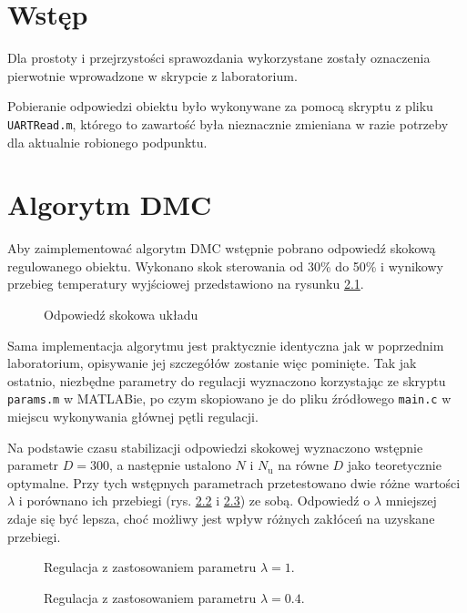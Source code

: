 \chapter{Wstęp}
Dla prostoty i przejrzystości sprawozdania wykorzystane zostały oznaczenia pierwotnie wprowadzone w skrypcie z laboratorium\@.

Pobieranie odpowiedzi obiektu było wykonywane za pomocą skryptu z pliku \verb|UARTRead.m|, którego to zawartość była nieznacznie zmieniana w razie potrzeby dla aktualnie robionego podpunktu.



\chapter{Algorytm DMC}

Aby zaimplementować algorytm DMC wstępnie pobrano odpowiedź skokową regulowanego obiektu. Wykonano skok sterowania od 30\% do 50\% i wynikowy przebieg temperatury wyjściowej przedstawiono na rysunku \ref{step}.

\begin{figure}[H]
	\centering
	
	\caption{Odpowiedź skokowa układu}
	\label{step}
\end{figure}

Sama implementacja algorytmu jest praktycznie identyczna jak w poprzednim laboratorium, opisywanie jej szczegółów zostanie więc pominięte. Tak jak ostatnio, niezbędne parametry do regulacji wyznaczono korzystając ze skryptu \verb|params.m| w MATLABie, po czym skopiowano je do pliku źródłowego \verb|main.c| w miejscu wykonywania głównej pętli regulacji.

Na podstawie czasu stabilizacji odpowiedzi skokowej wyznaczono wstępnie parametr $ D = 300 $, a następnie ustalono $ N $ i $ N_\mathrm{u} $ na równe $ D $ jako teoretycznie optymalne. Przy tych wstępnych parametrach przetestowano dwie różne wartości $ \lambda $ i porównano ich przebiegi (rys. \ref{DMC1} i \ref{DMC2}) ze sobą. Odpowiedź o $ \lambda $ mniejszej zdaje się być lepsza, choć możliwy jest wpływ różnych zakłóceń na uzyskane przebiegi.


\begin{figure}[H]
\centering

\caption{Regulacja z zastosowaniem parametru $ \lambda=1 $.}
\label{DMC1}
\end{figure}

\begin{figure}[H]
\centering

\caption{Regulacja z zastosowaniem parametru $ \lambda=\num{0,4} $.}
\label{DMC2}
\end{figure}

